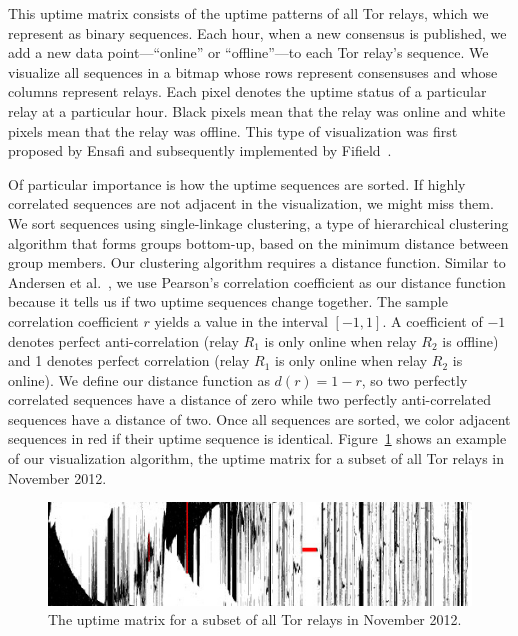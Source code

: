This uptime matrix consists of the uptime patterns of all Tor relays, which we
represent as binary sequences.  Each hour, when a new consensus is published, we
add a new data point---``online'' or ``offline''---to each Tor relay's sequence.
We visualize all sequences in a bitmap whose rows represent consensuses and
whose columns represent relays.  Each pixel denotes the uptime status of a
particular relay at a particular hour.  Black pixels mean that the relay was
online and white pixels mean that the relay was offline.  This type of
visualization was first proposed by Ensafi and subsequently implemented by
Fifield~\cite{Fifield2014a}.

Of particular importance is how the uptime sequences are sorted.  If highly
correlated sequences are not adjacent in the visualization, we might miss them.
We sort sequences using single-linkage clustering, a type of hierarchical
clustering algorithm that forms groups bottom-up, based on the minimum distance
between group members.  Our clustering algorithm requires a distance function.
Similar to Andersen et al.~\cite{Andersen2002a}, we use Pearson's correlation
coefficient as our distance function because it tells us if two uptime sequences
change together.  The sample correlation coefficient $r$ yields a value in the
interval $[-1, 1]$.  A coefficient of $-1$ denotes perfect anti-correlation
(relay $R_1$ is only online when relay $R_2$ is offline) and 1 denotes perfect
correlation (relay $R_1$ is only online when relay $R_2$ is online).  We define
our distance function as $d(r) = 1 - r$, so two perfectly correlated sequences
have a distance of zero while two perfectly anti-correlated sequences have a
distance of two.  Once all sequences are sorted, we color adjacent sequences in
red if their uptime sequence is identical.  Figure~\ref{fig:uptime-matrix} shows
an example of our visualization algorithm, the uptime matrix for a subset of all
Tor relays in November 2012.

\begin{figure}[t]
	\centering
	\includegraphics[width=\linewidth]{diagrams/2012-11.jpg}
	\caption{The uptime matrix for a subset of all Tor relays in November 2012.}
	\label{fig:uptime-matrix}
\end{figure}

